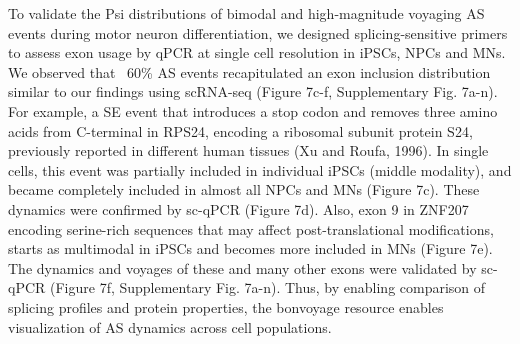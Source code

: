 To validate the Psi distributions of bimodal and high-magnitude voyaging AS events during motor neuron differentiation, we designed splicing-sensitive primers to assess exon usage by qPCR at single cell resolution in iPSCs, NPCs and MNs. We observed that ~60\% AS events recapitulated an exon inclusion distribution similar to our findings using scRNA-seq (Figure 7c-f, Supplementary Fig. 7a-n). For example, a SE event that introduces a stop codon and removes three amino acids from C-terminal in RPS24, encoding a ribosomal subunit protein S24, previously reported in different human tissues (Xu and Roufa, 1996). In single cells, this event was partially included in individual iPSCs (middle modality), and became completely included in almost all NPCs and MNs (Figure 7c). These dynamics were confirmed by sc-qPCR (Figure 7d). Also, exon 9 in ZNF207 encoding serine-rich sequences that may affect post-translational modifications, starts as multimodal in iPSCs and becomes more included in MNs (Figure 7e). The dynamics and voyages of these and many other exons were validated by sc-qPCR (Figure 7f, Supplementary Fig. 7a-n). Thus, by enabling comparison of splicing profiles and protein properties, the bonvoyage resource enables visualization of AS dynamics across cell populations.





